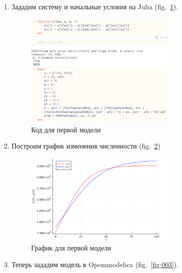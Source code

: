 \documentclass[
  12pt,
  a4paper,
]{scrreprt}
\begin{document}
\begin{enumerate}
\def\labelenumi{\arabic{enumi}.}
\item
  Зададим систему и начальные условия на Julia (fig.~\ref{fig:001}).

  \begin{figure}
  \hypertarget{fig:001}{%
  \centering
  \includegraphics[width=0.7\textwidth,height=\textheight]{./tex2pdf.-eff22ba2c7041204/image/j1.PNG}
  \caption{Код для первой модели}\label{fig:001}
  }
  \end{figure}
\item
  Построим график изменения численности (fig.~\ref{fig:002})

  \begin{figure}
  \hypertarget{fig:002}{%
  \centering
  \includegraphics[width=0.7\textwidth,height=\textheight]{./tex2pdf.-eff22ba2c7041204/image/j1p.PNG}
  \caption{График для первой модели}\label{fig:002}
  }
  \end{figure}
\item
  Теперь зададим модель в Opemmodelica (fig.~\ref{fig:003}).


\end{enumerate}
\end{document}
